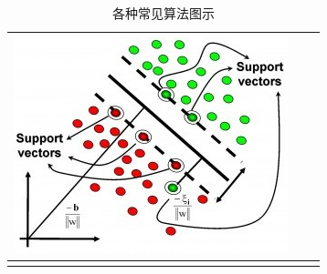 \begin{longtable}[]{ccc}
\begin{minipage}{0.1\linewidth}
  \includegraphics[width=1.0\linewidth]{./img/ch2/sec1/6.jpg}  
\end{minipage}
\tabularnewline
\bottomrule
\caption{各种常见算法图示}
\end{longtable}

